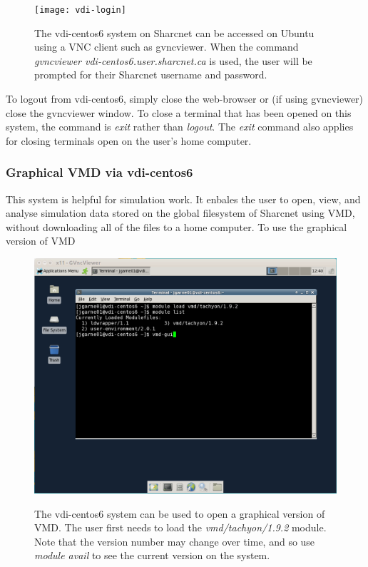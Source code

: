 \documentclass[12pt]{article}
\begin{document}
\begin{figure}[H]
\centering
\caption{The vdi-centos6 system on Sharcnet can be accessed on Ubuntu using a VNC client such as gvncviewer. When the command \textit{gvncviewer vdi-centos6.user.sharcnet.ca} is used, the user will be prompted for their Sharcnet username and password.}
\texttt{[image: vdi-login]}
\label{vdi-login}
\end{figure}

\quad To logout from vdi-centos6, simply close the web-browser or (if using gvncviewer) close the gvncviewer window. To close a terminal that has been opened on this system, the command is \textit{exit} rather than \textit{logout}. The \textit{exit} command also applies for closing terminals open on the user's home computer.

\subsubsection{Graphical VMD via vdi-centos6}

\quad This system is helpful for simulation work. It enbales the user to open, view, and analyse simulation data stored on the global filesystem of Sharcnet using VMD, without downloading all of the files to a home computer. To use the graphical version of VMD

\begin{figure}[H]
\centering
\caption{The vdi-centos6 system can be used to open a graphical version of VMD. The user first needs to load the \textit{vmd/tachyon/1.9.2} module. Note that the version number may change over time, and so use \textit{module avail} to see the current version on the system.}
\includegraphics[width=\textwidth]{vdi-load-vmd}
\label{vdi-load-vmd}
\end{figure}
\end{document}
